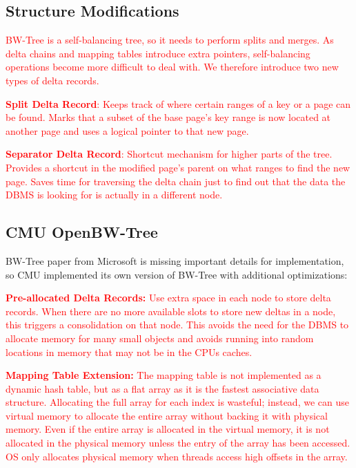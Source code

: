 \documentclass[11pt]{article}
\newcommand{\rr}[1]{\textcolor{red}{#1}}
\begin{document}
\subsection*{Structure Modifications}
\rr{BW-Tree is a self-balancing tree, so it needs to perform splits and merges. As delta chains and mapping tables introduce extra pointers, self-balancing operations become more difficult to deal with. We therefore introduce two new types of delta records.}

\rr{\textbf{Split Delta Record}: Keeps track of where certain ranges of a key or a page can be found. Marks that a subset of the base page's key range is now located at another page and uses a logical pointer to that new page.}

\rr{\textbf{Separator Delta Record}: Shortcut mechanism for higher parts of the tree. Provides a shortcut in the modified page's parent on what ranges to find the new page. Saves time for traversing the delta chain just to find out that the data the DBMS is looking for is actually in a different node.}
\subsection*{CMU OpenBW-Tree}
BW-Tree paper from Microsoft is missing important details for implementation, so CMU implemented its own version of BW-Tree\cite{wang18} with additional optimizations:

\rr{\textbf{Pre-allocated Delta Records:} Use extra space in each node to store delta records. When there are no more available slots to store new deltas in a node, this triggers a consolidation on that node. This avoids the need for the DBMS to allocate memory for many small objects and avoids running into random locations in memory that may not be in the CPUs caches.}
        
\rr{\textbf{Mapping Table Extension:} The mapping table is not implemented as a dynamic hash table, but as a flat array as it is the fastest associative data structure. Allocating the full array for each index is wasteful; instead, we can use virtual memory to allocate the entire array without backing it with physical memory. Even if the entire array is allocated in the virtual memory, it is not allocated in the physical memory unless the entry of the array has been accessed. OS only allocates physical memory when threads access high offsets in the array.}

\newpage


\end{document}
